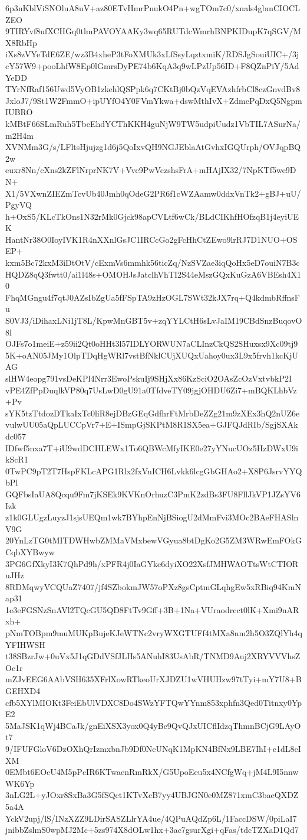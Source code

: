6p3nKblViSNOluA8uV+az80ETvHmrPnukO4Pn+wgTOm7c0/xnals4gbmCIOCLZEO
9TIRYvf8ufXCHGq0tlmPAVOYAAKy3wq65RUTdcWmrhBNPKIDupK7qSGV/MX8RbHp
iXs8zVYeTdE6ZE/wz3B4xheP3tFoXMUk3xLfSsyLqztxmiK/RDSJgSouiUIC+/3j
cY57W9+pooLhfW8Ep0lGmrsDyPE74b6KqA3q9wLPzUp56ID+F8QZnPiY/5AdYeDD
TYrNfRaf156Uwd5VyOB1zkehlQSPpk6q7CKtBj0bQzVqEVAzhfrbCl8czGnvdBv8
JxloJ7/9St1W2FmmO+ipUYfO4Y0FVmYkwa+dswMthIvX+ZdmePqDxQ5NgpmIUBRO
kMBtF66SLmRuh5TbeEhdYCThKKH4guNjW9TW5udpiUudz1VbTIL7ASurNa/m2H4m
XVNMm3G/s/LFltsHjujzg1d6j5QoIxvQH9NGJEblaAtGvhxIGQUrph/OVJqpBQ2w
euxr8Nn/cXns2kZFlNrprNK7V+Vvc9PwVczshsFrA+mHAjIX32/7NpKTf5we9DN+
X1/5VXwnZIEZmTcvUb40Jmh0qOdeG2PR6f1cWZAamw0ddxVnTk2+gBJ+uU/PgyVQ
h+OxS5/KLcTkOns1N32rMk0Gjck98apCVLtf6wCk/BLdCIKhfHOfzqB1j4eyiUEK
HantNr38O0IoyIVK1R4nXXnlGsJC1IRCcGo2gFcHhCtZEwo9lrRJ7D1NUO+OSEP+
kxm5Bc72kxM3iDtOtV/cExmVs6mmhk56ticZq/NzSVZae3iqQoHx5eD7ouiN7B3c
HQDZ8qQ3fwtt0/ai1l48s+OMOHJsJatclhVhTI2S44eMszGQxKuGzA6VBEsh4X10
FhqMGngu4f7qtJ0AZsIbZgUa5fFSpTA9zHzOGL7SWt32kJX7rq+Q4kdmbRffnsFu
S0VJ3/iDihaxLNi1jT8L/KpwMnGBT5v+zqYYLCtH6sLvJaIM19CBdSnzBuqovO8l
OJFs7o1meiE+z59ii2Qt0oHHt3l57IDLYORWUN7aCLInzCkQS2SHuxsx9Xc09tj9
5K+oAN05JMy1OlpTDqHgWRl7vstBfNklCUjXUQxUahoy0ux3L9x5frvh1kcKjUAG
slHW4eopg791vsDeKPl4Nrr3EwoPskuIj9SHjXx86KzSciO2OAsZcOzVxtvbkP2I
vPE4ZfPpDuqlkVP80q7UsLwD0gU91a0TfdveTY09jgjOHDU6Zi7+mBQKLhbVz+Pv
sYK5tzTtdozDTkaIxTc0liR8ejDBzGEqGdfhrFtMrbDeZZg21m9zXEx3hQ2nUZ6e
vulwUU05aQpLUCCpVr7+E+ISmpGjSKPtM8R1SX5ea+GJFQJdRIb/SgjSXAkdc057
IDfwf5nxa7T+iU9wdDCHLEWx1To6QBWcMfyIKE0e27yYNucUOz5HzDWxU9ikScR1
0TwPC9pT2T7HspFKLcAPG1Rlx2fxVnICH6Lvkk6lcgGbGHAo2+X8P6JsrvYYQbPl
GQFbsIaUA8Qcqu9Fm7jKSEk9KVKnOrhuzC3PmK2zdBs3FU8FllJkVP1JZsYV6Izk
z1k0GLUgzLuyzJ1sjsUEQm1wk7BYhpEnNjBSiogU2dMmFvi3MOc2BAeFHASlnV9G
20YnLzTG0tMITDWHwbZMMaVMxbewVGyua8btDgKo2G5ZM3WRwEmFOkGCqbXYBwyw
3PG6GfXkyI3K7QhPd9h/xPFR4j0IaGYke6dyiXO22XsfJMHWAOTtsWtCTIORuJHz
8RDMqwyVCQUaZ7407/jf4SZbokmJW57oPXz8gsCptmGLqhgEw5xRBiq94KmNap31
1e3eFGSNzSnAVl2TQcGU5QD8FtTv9Gff+3B+1Na+VUraodrcct0lK+Xmi9nARxh+
pNmTOBpm9muMUKpBujeKJeWTNc2vryWXGTUFf4tMXa8nm2h5O3ZQlYh4qYFIHWSH
t38SBzrJw+0uVx5J1qGDdVSfJLHs5ANuhI83UsAbR/TNMD9Auj2XRYVVVhsZOc1r
mZJvEEG6AAbVSH635XFrlXowRTkeoUrXJDZU1wVHUHzw97tTyi+mY7U8+BGEHXD4
cfb5XYlMIOKt3FeiEbUlVDXC8Do4SWzYFTQwYYnm853xphfn3Qed0Titnxy0YpE2
5MaJSK1qWj4BCaJk/gnEiXSX3yox0Q4yBc9QvQJxUICflIdzqThmnBCjG9LAyOt7
9/IFUFGloV6DzOXhQrIzmxbnJb9Df0NcUNqK1MpKN4BfNx9LBE7IhI+c1dL8cIXM
0EMbt6EOcU4M5pPcIR6KTwaenRmRkX/G5UpoEeu5x4NCfgWq+jM4L9I5nnwWK6Yp
3nLG2L+yJOxr8SxBa3G5fSQct1KTvXcB7yy4UBJGN0e0MZ871xmC3baeQXDZ5a4A
YckV2upj/lS/INzXZZ9LDirSASZLlrYA4ue/4QPuAQdZp6L/1FaccDSW/0piLaI7
jnibbZslmS0wpMJ2Mc+5zs974X8dOLw1hx+3ac7gsurXgi+qFas/tdcTZXaD1Qd7
